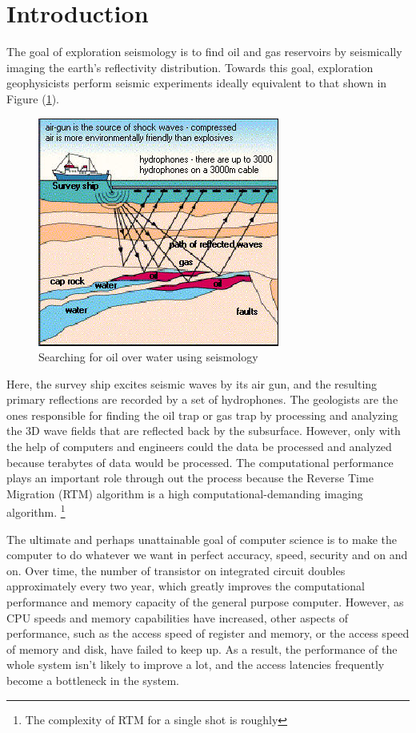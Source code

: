 
\section{Introduction}

The goal of exploration seismology is to find oil and gas reservoirs
by seismically imaging the earth's reflectivity distribution. Towards
this goal, exploration geophysicists perform seismic experiments ideally
equivalent to that shown in Figure (\ref{fig:oil-drilling}).

\begin{figure}[h]
\centering
\includegraphics[scale=0.65]{img/oil-drilling-prospecting2.jpg}
\caption{Searching for oil over water using seismology}
\label{fig:oil-drilling}
\end{figure}

Here,
the survey ship excites seismic waves by its air gun, and the resulting
primary reflections are recorded by a set of hydrophones. The geologists
are the ones responsible for finding the oil trap or gas trap by processing
and analyzing the 3D wave fields that are reflected back by the subsurface.
However, only with the help of computers and engineers could the data
be processed and analyzed because terabytes of data would be processed.
The computational performance plays an important role through out
the process because the Reverse Time Migration (RTM) algorithm is
a high computational-demanding imaging algorithm.%
\footnote{The complexity of RTM for a single shot is roughly %
}



The ultimate and perhaps unattainable goal of computer science is
to make the computer to do whatever we want in perfect accuracy, speed,
security and on and on. Over time, the number of transistor on integrated
circuit doubles approximately every two year, which greatly improves
the computational performance and memory capacity of the general purpose
computer. However, as CPU speeds and memory capabilities have increased,
other aspects of performance, such as the access speed of register
and memory, or the access speed of memory and disk, have failed to
keep up. As a result, the performance of the whole system isn't likely
to improve a lot, and the access latencies frequently become a bottleneck
in the system.

